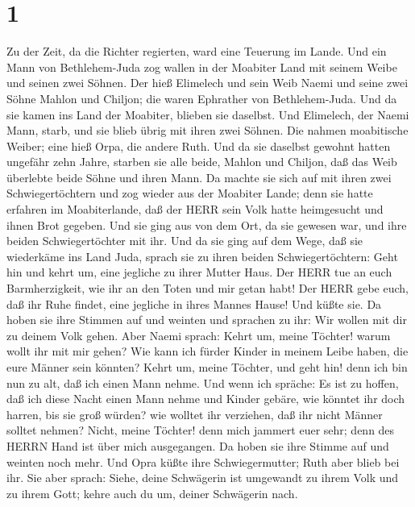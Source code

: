 \hypertarget{section}{%
\section{1}\label{section}}

 Zu der Zeit, da die Richter regierten, ward eine Teuerung
im Lande. Und ein Mann von Bethlehem-Juda zog wallen in der Moabiter
Land mit seinem Weibe und seinen zwei Söhnen.  Der hieß
Elimelech und sein Weib Naemi und seine zwei Söhne Mahlon und Chiljon;
die waren Ephrather von Bethlehem-Juda. Und da sie kamen ins Land der
Moabiter, blieben sie daselbst.  Und Elimelech, der Naemi
Mann, starb, und sie blieb übrig mit ihren zwei Söhnen.  Die
nahmen moabitische Weiber; eine hieß Orpa, die andere Ruth. Und da sie
daselbst gewohnt hatten ungefähr zehn Jahre,  starben sie
alle beide, Mahlon und Chiljon, daß das Weib überlebte beide Söhne und
ihren Mann.  Da machte sie sich auf mit ihren zwei
Schwiegertöchtern und zog wieder aus der Moabiter Lande; denn sie hatte
erfahren im Moabiterlande, daß der HERR sein Volk hatte heimgesucht und
ihnen Brot gegeben.  Und sie ging aus von dem Ort, da sie
gewesen war, und ihre beiden Schwiegertöchter mit ihr. Und da sie ging
auf dem Wege, daß sie wiederkäme ins Land Juda,  sprach sie
zu ihren beiden Schwiegertöchtern: Geht hin und kehrt um, eine jegliche
zu ihrer Mutter Haus. Der HERR tue an euch Barmherzigkeit, wie ihr an
den Toten und mir getan habt!  Der HERR gebe euch, daß ihr
Ruhe findet, eine jegliche in ihres Mannes Hause! Und küßte sie. Da
hoben sie ihre Stimmen auf und weinten  und sprachen zu
ihr: Wir wollen mit dir zu deinem Volk gehen.  Aber Naemi
sprach: Kehrt um, meine Töchter! warum wollt ihr mit mir gehen? Wie kann
ich fürder Kinder in meinem Leibe haben, die eure Männer sein könnten?
 Kehrt um, meine Töchter, und geht hin! denn ich bin nun zu
alt, daß ich einen Mann nehme. Und wenn ich spräche: Es ist zu hoffen,
daß ich diese Nacht einen Mann nehme und Kinder gebäre, 
wie könntet ihr doch harren, bis sie groß würden? wie wolltet ihr
verziehen, daß ihr nicht Männer solltet nehmen? Nicht, meine Töchter!
denn mich jammert euer sehr; denn des HERRN Hand ist über mich
ausgegangen.  Da hoben sie ihre Stimme auf und weinten noch
mehr. Und Opra küßte ihre Schwiegermutter; Ruth aber blieb bei ihr.
 Sie aber sprach: Siehe, deine Schwägerin ist umgewandt zu
ihrem Volk und zu ihrem Gott; kehre auch du um, deiner Schwägerin nach.
